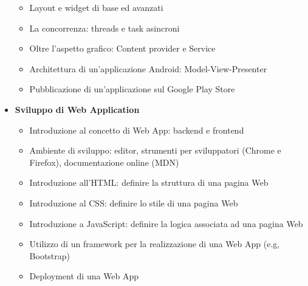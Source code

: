 \documentclass[11pt,a4paper]{book}
\begin{document}
\begin{itemize}
\begin{itemize}
		\item Layout e widget di base ed avanzati
		\item La concorrenza: threads e task asincroni
		\item Oltre l'aspetto grafico: Content provider e Service
		\item Architettura di un'applicazione Android: Model-View-Presenter
		\item Pubblicazione di un'applicazione sul Google Play Store
	\end{itemize}
	\item  \textbf{Sviluppo di Web Application}
	\begin{itemize}
		\item Introduzione al concetto di Web App: backend e frontend
		\item Ambiente di sviluppo: editor, strumenti per sviluppatori (Chrome e Firefox), documentazione online (MDN)
		\item Introduzione all'HTML: definire la struttura di una pagina Web
		\item Introduzione al CSS: definire lo stile di una pagina Web
		\item Introduzione a JavaScript: definire la logica associata ad una pagina Web
		\item Utilizzo di un framework per la realizzazione di una Web App (e.g, Bootstrap)
		\item Deployment di una Web App	
	\end{itemize}
\end{itemize}
\end{document}
